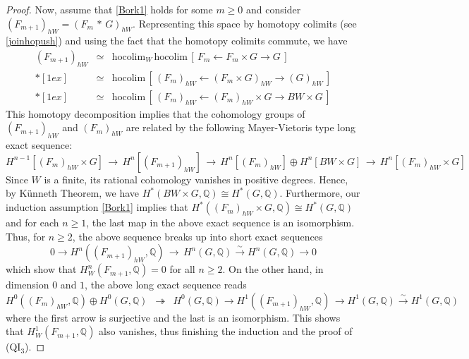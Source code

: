 \documentclass[11pt]{amsart}
\theoremstyle{definition}
\theoremstyle{remark}
\numberwithin{equation}{section}
\newcommand{\onto}{\,\,\twoheadrightarrow\,\,}
\newcommand{\la}{\label}
\newcommand{\hocolim}{\mathrm{hocolim}}
\def\Q{\mathbb{Q}}
\begin{document}
\begin{proof}
Now, assume that \eqref{Bork1} holds for some $ m \ge 0 $ and consider 
$ (F_{m+1})_{hW} = (F_m \,\ast\,G)_{hW} $. Representing this space by homotopy colimits (see \eqref{joinhopush})
and using the fact that the homotopy colimits commute, we have
%
\begin{eqnarray*}\la{eq7}
 (F_{m+1})_{hW}  & \simeq &  \hocolim_W\,\hocolim\,[\,F_m \leftarrow F_m \times G \to G\,] \\*[1ex]
& \simeq &  \hocolim\,[\,(F_m)_{hW} \leftarrow (F_m \times G)_{hW} \to (G)_{hW}\,] \\*[1ex]
& \simeq &  \hocolim\,[\,(F_m)_{hW} \leftarrow (F_m)_{hW} \times G \to BW \times G\,]
 \end{eqnarray*}
%
This homotopy decomposition implies that the cohomology groups of  $ (F_{m+1})_{hW} $ and $ (F_{m})_{hW} $ are related by the following Mayer-Vietoris type long exact sequence:
%
$$
 H^{n-1}[(F_m)_{hW} \times G] \,\to\, 
H^{n}[(F_{m+1})_{hW}] \,\to\, H^{n}[(F_m)_{hW}] \oplus H^n[BW \times G] \,\to\, 
H^{n}[(F_m)_{hW} \times G] 
$$
%
Since $W$ is a finite, its rational cohomology  vanishes in positive degrees. Hence, by K\"unneth Theorem, we have $ H^\ast(BW \times G, \Q) \cong H^\ast(G, \Q) $. Furthermore, our induction assumption \eqref{Bork1} implies that $ H^\ast((F_m)_{hW} \times G, \Q) \cong H^*(G,\Q) $ and for each $ n \ge 1 $,
the last map in the above exact sequence is an isomorphism. Thus, for $ n\ge 2 $,
the above sequence breaks up into short exact sequences
%
$$
0 \to H^{n}((F_{m+1})_{hW}, \Q) \,\to\, H^n(G, \Q) \xrightarrow{\sim} H^n(G, \Q) \to 0
$$
%
which show that $ H_W^{n}(F_{m+1}, \Q) = 0 $ for all $ n \ge 2 $. On the other hand, in dimension $0$ and $1$, the above long exact sequence reads
%
$$
 H^{0}((F_m)_{hW},\Q) \oplus H^0(G,\Q) \,\onto\, H^0(G,\Q) \to  H^{1}((F_{m+1})_{hW}, \Q) \,\to 
H^1(G, \Q) \xrightarrow{\sim} H^1(G, \Q)
$$
%
where the first arrow is surjective and the last is an isomorphism. This shows that 
$ H_W^1 (F_{m+1}, \Q) $ also vanishes, thus finishing the induction and the proof of (QI$_{3}$).
\end{proof}
%
\end{document}
